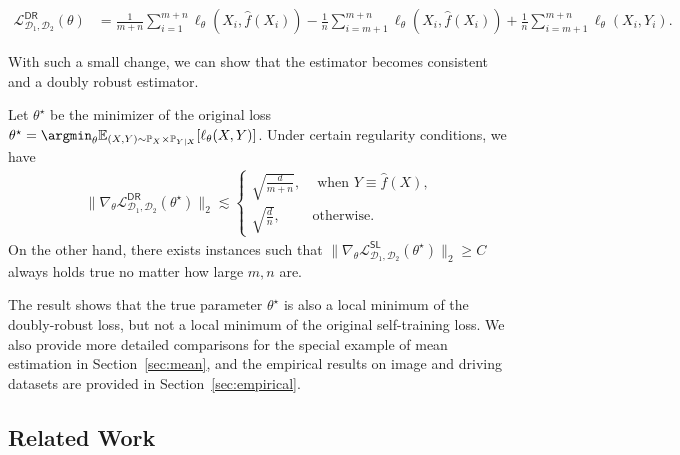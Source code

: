 \begin{align*}
\mathcal{L}^{\mathsf{DR}}_{\mathcal{D}_1,\mathcal{D}_2}(\theta) 
& = \frac{1}{m+n}  \sum_{i=1}^{m+n} \ell_\theta(X_i, \hat f(X_i)) -  \frac{1}{n} \sum_{i=m+1}^{m+n} \ell_\theta(X_i, \hat f(X_i))  + \frac{1}{n} \sum_{i=m+1}^{m+n} \ell_\theta(X_i, Y_i). 
\end{align*}

With such a small change, we can show that the estimator becomes consistent and a doubly robust estimator. 
\begin{theorem}[Informal]
    Let $\theta^\star$ be the minimizer of the original loss  $\theta^\star = \argmin_{\theta} \mathbb{E}_{(X, Y)\sim \mathbb{P}_{X}\times \mathbb{P}_{Y|X}}[\ell_\theta(X, Y)]$. Under certain regularity conditions, we have 
    \begin{align*}
  \| \nabla_\theta \mathcal{L}^{\mathsf{DR}}_{\mathcal{D}_1,\mathcal{D}_2}(\theta^\star) \|_2 \lesssim  
  \begin{cases}
  \sqrt{\frac{d}{m+n}}, & \text{ when } Y \equiv \hat f(X), \\
  \sqrt{\frac{d}{n}}, & \text{otherwise}. 
  \end{cases}
\end{align*}  
On the other hand, there exists instances such that $  \| \nabla_\theta \mathcal{L}^{\mathsf{SL}}_{\mathcal{D}_1,\mathcal{D}_2}(\theta^\star) \|_2\geq C$ always holds true no matter how large $m, n$ are. 
\end{theorem} 
The result shows that the true parameter $\theta^\star$ is also a local minimum of the doubly-robust loss, but not a local minimum of the original self-training loss.  We also provide more detailed comparisons for the special example of mean estimation in Section~\ref{sec:mean}, and the empirical results on image and driving datasets are provided in  Section~\ref{sec:empirical}.


\subsection{Related Work}


